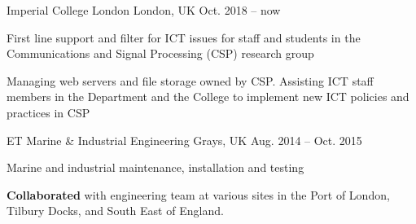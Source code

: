 

\begin{cventries}
            {Imperial College London} %
            {London, UK} %
            {Oct. 2018 -- now} %
            {
                \begin{cvitems} %
                    \item {First line support and filter for ICT issues for staff and students in the Communications and Signal Processing (CSP) research group}
                    \item {Managing web servers and file storage owned by CSP. Assisting ICT staff members in the Department and the College to implement new ICT policies and practices in CSP}
                \end{cvitems}
            }
            
            {ET Marine	\& Industrial Engineering} %
            {Grays, UK} %
            {Aug. 2014 -- Oct. 2015} %
            {
                \begin{cvitems} %
                    \item {Marine and industrial maintenance, installation and testing}
                    \item {\textbf{Collaborated} with engineering team at various sites in the Port of London, Tilbury Docks, and South East of England.}
                \end{cvitems}
            }
\end{cventries}
